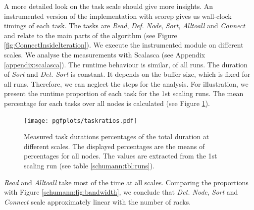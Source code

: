 A more detailed look on the task scale should give more insights.
An instrumented version of the implementation with scorep gives us wall-clock timings of each task.
The tasks are \emph{Read}, \emph{Def. Node}, \emph{Sort}, \emph{Alltoall} and \emph{Connect} and relate to the main 
parts of the algorithm (see Figure \ref{fig:ConnectInsideIteration}).
We execute the instrumented module on different scales.
We analyse the measurements with Scalasca (see Appendix \ref{appendix:scalasca}).
The runtime behaviour is similar, of all runs.
The duration of \emph{Sort} and \emph{Det. Sort} is constant.
It depends on the buffer size, which is fixed for all runs.
Therefore, we can neglect the steps for the analysis.
For illustration, we present the runtime proportion of each task for the 1st scaling runs.
The mean percentage for each tasks over all nodes is calculated (see Figure \ref{schumann:fig:taskratios}).
\begin{figure}[h!]
\begin{center}
 \texttt{[image: pgfplots/taskratios.pdf]}
\end{center}
\caption{Measured task durations percentages of the total duration at different scales.
 The displayed percentages are the means of percentages for all nodes.
 The values are extracted from the 1st scaling run (see table \ref{schumann:tbl:runs}).
 }
\label{schumann:fig:taskratios}
\end{figure}

\emph{Read} and \emph{Alltoall} take most of the time at all scales.
Comparing the proportions with Figure \ref{schumann:fig:bandwidth}, we conclude that
\emph{Det. Node}, \emph{Sort} and \emph{Connect} scale approximately linear with the number of racks.

